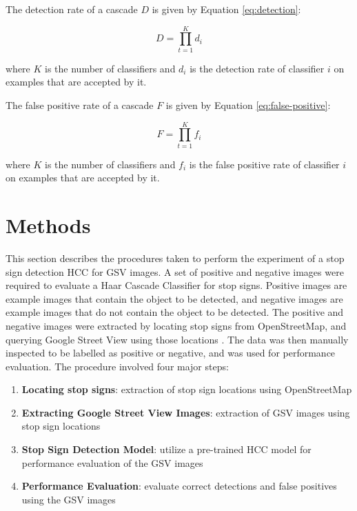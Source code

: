 The detection rate of a cascade $D$ is given by Equation \ref{eq:detection}:

\begin{equation} \label{eq:detection}
D = \prod_{t=1}^K d_i
\end{equation}

where $K$ is the number of classifiers and $d_i$ is the detection rate of classifier $i$ on examples that are accepted by it. 

The false positive rate of a cascade $F$ is given by Equation \ref{eq:false-positive}:

\begin{equation} \label{eq:false-positive}
F = \prod_{t=1}^K f_i
\end{equation}

where $K$ is the number of classifiers and $f_i$ is the false positive rate of classifier $i$ on examples that are accepted by it. 

\section{Methods} \label{methods}

This section describes the procedures taken to perform the experiment of a stop sign detection HCC for GSV images. A set of positive and negative images were required to evaluate a Haar Cascade Classifier for stop signs. Positive images are example images that contain the object to be detected, and negative images are example images that do not contain the object to be detected. The positive and negative images were extracted by locating stop signs from OpenStreetMap, and querying Google Street View using those locations \cite{Haklay:2008}. The data was then manually inspected to be labelled as positive or negative, and was used for performance evaluation. The procedure involved four major steps:

\begin{enumerate}
  \item \textbf{Locating stop signs}: extraction of stop sign locations using OpenStreetMap
  \item \textbf{Extracting Google Street View Images}: extraction of GSV images using stop sign locations
  \item \textbf{Stop Sign Detection Model}: utilize a pre-trained HCC model for performance evaluation of the GSV images
  \item \textbf{Performance Evaluation}: evaluate correct detections and false positives using the GSV images
\end{enumerate}

